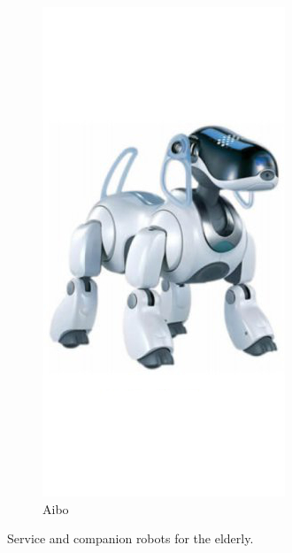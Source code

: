 \begin{figure}[h]
\begin{subfigure}[h]{0.2\textwidth}
                \includegraphics[width=\textwidth]{./img/aibo}
                \caption{Aibo}
                \label{fig:aibo}
        \end{subfigure}
        \caption{Service and companion robots for the elderly.}\label{fig:elder-robots}
\end{figure}

